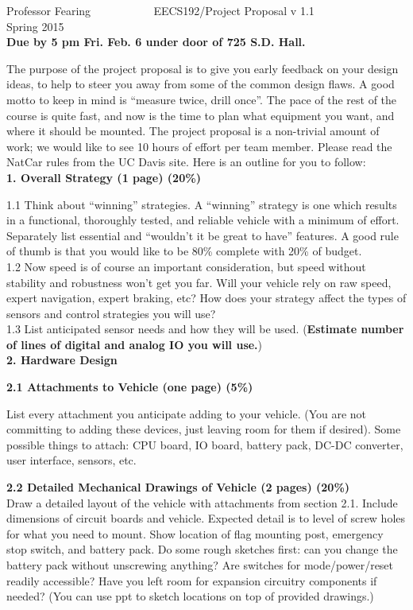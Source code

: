 \documentclass[10pt]{article}
\begin{document}
\thispagestyle{empty}
Professor Fearing ~~~~~~~~~~ EECS192/Project Proposal v 1.1 ~~~~~~~~~~~ Spring 2015\\
{\bf Due by 5 pm Fri. Feb. 6 under door of 725 S.D. Hall.} 


The purpose of the project proposal is to give you early feedback on
your design ideas, to help to steer you away from some of the common
design flaws. A good motto to keep in mind is
``measure twice, drill once''. The pace of the rest of the course is
quite fast, and now is the time to plan what equipment you want, and
where it should be mounted. 
The project proposal is a non-trivial amount of work; we
would like to see 10 hours of effort per team member. Please
read the NatCar rules from the UC Davis site.
Here is an outline for you to follow:\\

{\bf 1. Overall Strategy (1 page) (20\%)}

1.1
Think about ``winning''
strategies. A ``winning'' strategy is one which results in
a functional, thoroughly tested, and reliable vehicle with a minimum
of effort. Separately list essential and 
``wouldn't it be great to have'' features. A good rule of thumb
is that you would like to be 80\% complete with 20\% of budget.\\

1.2
Now speed is of course an important consideration,
but speed without stability and robustness won't get you far.
Will your vehicle rely on raw speed, expert navigation,
expert braking, etc?  How does your strategy affect the types of sensors and
control strategies you will use?  \\

1.3
List anticipated sensor needs and
how they will be used. ({\bf Estimate number of lines of digital and analog
IO you will use.})\\

{\bf 2. Hardware Design }

{\bf 2.1 Attachments to Vehicle (one page) (5\%)}

List every attachment you anticipate adding to your vehicle. (You are
not committing to adding these devices, just leaving room for them if
desired). Some possible things to attach: CPU board, IO board, 
battery pack, DC-DC converter, user interface, sensors,
etc.

{\bf 2.2 Detailed Mechanical Drawings of Vehicle (2 pages) (20\%)}\\
Draw a detailed layout of the
vehicle with attachments from section 2.1. Include dimensions of
circuit boards and vehicle. Expected detail is to level of screw
holes for what you need to mount. 
Show location of flag mounting post, emergency stop switch,
and battery pack.
Do some rough sketches first: can you change the battery pack
without unscrewing anything? 
Are
switches for mode/power/reset readily accessible? Have you left room
for expansion circuitry components if needed?
(You can use ppt to sketch locations on top of provided drawings.)
\end{document}
